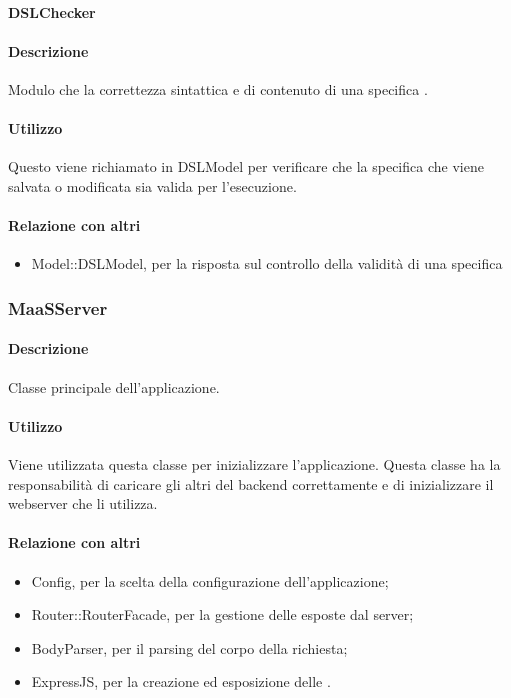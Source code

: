 \paragraph{DSLChecker}
\paragraph*{Descrizione}
Modulo che  la correttezza sintattica e di contenuto di una specifica .

\paragraph*{Utilizzo}
Questo  viene richiamato in DSLModel per verificare che la specifica  che viene salvata o modificata sia valida per l'esecuzione.

\paragraph*{Relazione con altri }
\begin{itemize}
\item Model::DSLModel, per la risposta sul controllo della validità di una specifica 
\end{itemize}

\subsubsection{MaaSServer}
\paragraph*{Descrizione}
Classe principale dell'applicazione.

\paragraph*{Utilizzo}
Viene utilizzata questa classe per inizializzare l'applicazione. Questa classe ha la responsabilità di caricare gli altri  del backend correttamente e di inizializzare il webserver che li utilizza.
\paragraph*{Relazione con altri }
\begin{itemize}
\item Config, per la scelta della configurazione dell'applicazione;
\item Router::RouterFacade, per la gestione delle  esposte dal server;
\item BodyParser, per il parsing del corpo della richiesta;
\item ExpressJS, per la creazione ed esposizione delle  .
\end{itemize}

